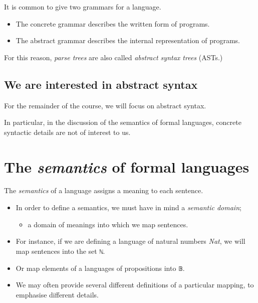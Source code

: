 \documentclass[11pt]{article}
\theoremstyle{definition}
\begin{document}
It is common to give two grammars for a language.
\begin{itemize}
\item The concrete grammar describes the written form of programs.
\item The abstract grammar describes the internal representation of programs.
\end{itemize}

For this reason, \emph{parse trees} are also called \emph{abstract syntax trees} (ASTs.)

\subsection{We are interested in abstract syntax}
\label{sec:org7dde460}
For the remainder of the course, we will focus on abstract syntax.

In particular, in the discussion of the semantics of formal languages,
concrete syntactic details are not of interest to us.

\section{The \emph{semantics} of formal languages}
\label{sec:orgbab7968}
The \emph{semantics} of a language assigns a meaning to each sentence.
\begin{itemize}
\item In order to define a semantics, we must
have in mind a \emph{semantic domain};
\begin{itemize}
\item a domain of meanings into which we map sentences.
\end{itemize}
\item For instance, if we are defining a language
of natural numbers \emph{Nat}, we will map sentences into the set \texttt{ℕ}.
\item Or map elements of a languages of propositions into \texttt{𝔹}.
\item We may often provide several different definitions of
a particular mapping, to emphasise different details.
\end{itemize}
\end{document}

